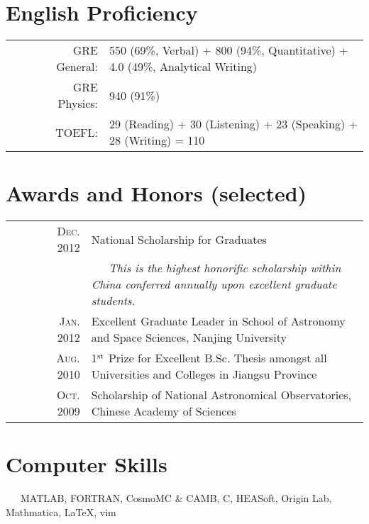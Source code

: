 \documentclass[10pt]{article}
\begin{document}
\vspace{-1em}
\section{English Proficiency}
\begin{tabular}{rl}
~~~~~GRE General:        & 550 (69\%, Verbal) + 800 (94\%, Quantitative) + 4.0 (49\%, Analytical Writing)    \\
~~~~~GRE Physics:        & 940 (91\%)    \\
~~~~~TOEFL:      &   29 (Reading) + 30 (Listening) + 23 (Speaking) + 28 (Writing) = 110
\end{tabular}

\section{Awards and Honors (selected)}
\begin{tabular}{rl}
~~~~~~\textsc{Dec. 2012} & National Scholarship for Graduates \\
& {\it\small ~~~This is the highest honorific scholarship within China conferred annually upon excellent graduate students.}\\
~~~~~~\textsc{Jan. 2012} & Excellent Graduate Leader in School of Astronomy and Space Sciences, Nanjing University  \\
~~~~~~\textsc{Aug. 2010} & 1$^{\rm st}$ Prize for Excellent B.Sc. Thesis amongst all Universities and Colleges in Jiangsu Province   \\
~~~~~~\textsc{Oct. 2009} & Scholarship of National Astronomical Observatories, Chinese Academy of Sciences    \\
\end{tabular}


\section{Computer Skills}
~~~MATLAB, FORTRAN, CosmoMC \& CAMB, C, HEASoft, Origin Lab, Mathmatica, \LaTeX, vim
\end{document}
